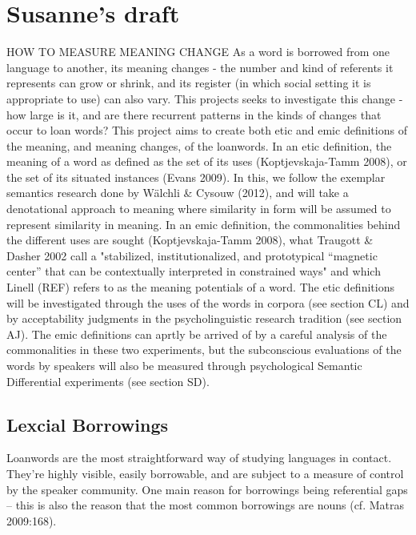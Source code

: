 \documentclass[a4paper]{article}
\begin{document}
\section{Susanne's draft}
HOW TO MEASURE MEANING CHANGE
As a word is borrowed from one language to another, its meaning changes - the number and kind of referents it represents can grow or shrink, and its register (in which social setting it is appropriate to use) can also vary. This projects seeks to investigate this change - how large is it, and are there recurrent patterns in the kinds of changes that occur to loan words?
This project aims to create both etic and emic definitions of the meaning, and meaning changes, of the loanwords. In an etic definition, the meaning of a word as defined as the set of its uses (Koptjevskaja-Tamm 2008), or the set of its situated instances (Evans 2009). In this, we follow the exemplar semantics research done by Wälchli \& Cysouw (2012), and will take a denotational approach to meaning where similarity in form will be assumed to represent similarity in meaning. In an emic definition, the commonalities behind the different uses are sought (Koptjevskaja-Tamm 2008), what Traugott \& Dasher 2002 call a "stabilized, institutionalized, and prototypical “magnetic center” that can be contextually interpreted in constrained ways" and which Linell (REF) refers to as the meaning potentials of a word.
The etic definitions will be investigated through the uses of the words in corpora (see section CL) and by acceptability judgments in the psycholinguistic research tradition (see section AJ). The emic definitions can aprtly be arrived of by a careful analysis of the commonalities in these two experiments, but the subconscious evaluations of the words by speakers will also be measured through psychological Semantic Differential experiments (see section SD).


\subsection{Lexcial Borrowings}

Loanwords are the most straightforward way of studying languages in contact. They're highly visible, easily borrowable, and are subject to a measure of control by the speaker community. One main reason for borrowings being referential gaps -- this is also the reason that the most common borrowings are nouns (cf. Matras 2009:168).
\end{document}
